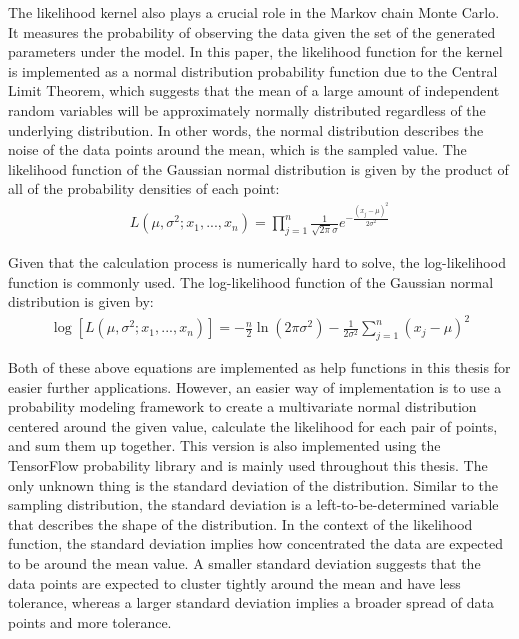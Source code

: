 The likelihood kernel also plays a crucial role in the Markov chain Monte Carlo. It measures the probability of observing the data given the set of the generated parameters under the model.\cite{likelihood_general} In this paper, the likelihood function for the kernel is implemented as a normal distribution probability function due to the Central Limit Theorem, which suggests that the mean of a large amount of independent random variables will be approximately normally distributed regardless of the underlying distribution.\cite{central_limit_theorem} In other words, the normal distribution describes the noise of the data points around the mean, which is the sampled value. The likelihood function of the Gaussian normal distribution is given by the product of all of the probability densities of each point:\cite{gaussian_likelihood}
\begin{align}
    L(\mu, \sigma^2; x_1, ..., x_n) = \prod_{j=1}^n \frac{1}{\sqrt{2\pi}\sigma} e^{-\frac{(x_j-\mu)^2}{2\sigma^2}}
\end{align}

Given that the calculation process is numerically hard to solve, the log-likelihood function is commonly used.\cite{log_likelihood} The log-likelihood function of the Gaussian normal distribution is given by:\cite{log_gaussian_likelihood}
\begin{align}
    \log[L(\mu, \sigma^2; x_1, ..., x_n)] = -\frac n 2\ln(2\pi\sigma^2) - \frac 1 {2\sigma^2}\sum_{j=1}^n (x_j - \mu)^2
\end{align}
 
Both of these above equations are implemented as help functions in this thesis for easier further applications. However, an easier way of implementation is to use a probability modeling framework to create a multivariate normal distribution centered around the given value, calculate the likelihood for each pair of points, and sum them up together. This version is also implemented using the TensorFlow probability library and is mainly used throughout this thesis. The only unknown thing is the standard deviation of the distribution. Similar to the sampling distribution, the standard deviation is a left-to-be-determined variable that describes the shape of the distribution. In the context of the likelihood function, the standard deviation implies how concentrated the data are expected to be around the mean value.\cite{standard_deviation_estimation} A smaller standard deviation suggests that the data points are expected to cluster tightly around the mean and have less tolerance, whereas a larger standard deviation implies a broader spread of data points and more tolerance. 

